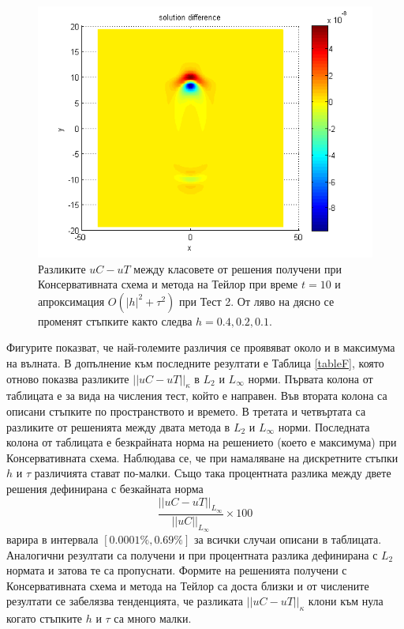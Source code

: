 \documentclass{article}
\begin{document}
\begin{figure}[ht]
\begin{minipage}[b]{0.32\linewidth}
		\includegraphics[width=\linewidth]{../amitans/figures/compare_128_bt1_c09_h010.png}
	\end{minipage}
\caption{Разликите $uC - uT$  между класовете от решения получени при Консервативната схема и метода на Тейлор при време $t=10$ и апроксимация $O(|h|^2 + \tau^2)$ при Тест 2. От ляво на дясно се променят стъпките както следва $h=0.4, 0.2, 0.1$.}
\label{Test2_Diff}
\end{figure}
\FloatBarrier
Фигурите показват, че най-големите различия се проявяват около и в максимума на вълната. В допълнение към последните резултати е Таблица \ref{tableF}, която отново показва разликите $||uC - uT||_\kappa$ в  $L_2$ и ${L_\infty}$ норми. Първата колона от таблицата е за вида на числения тест, който е направен. Във втората колона са описани стъпките по пространството и времето. В третата и четвъртата са разликите от решенията между двата метода в $L_2$ и ${L_\infty}$ норми. Последната колона от таблицата е безкрайната норма на решението (което е максимума) при Консервативната схема. Наблюдава се, че при намаляване на дискретните стъпки $h$ и $\tau$ различията стават по-малки. Също така процентната разлика между двете решения дефинирана с безкайната норма
$$\frac{ ||uC - uT||_{L_\infty}} { ||uC||_{L_\infty} } \times 100$$
варира в интервала $[0.0001\%, 0.69\%]$ за всички случаи описани в таблицата. Аналогични резултати са получени и при процентната разлика дефинирана с $L_2$ нормата и затова те са пропуснати. Формите на решенията получени с Консервативната схема и метода на Тейлор са доста близки и от числените резултати се забелязва тенденцията, че разликата $||uC - uT||_\kappa$ клони към нула когато стъпките $h$ и $\tau$ са много малки.
\end{document}
